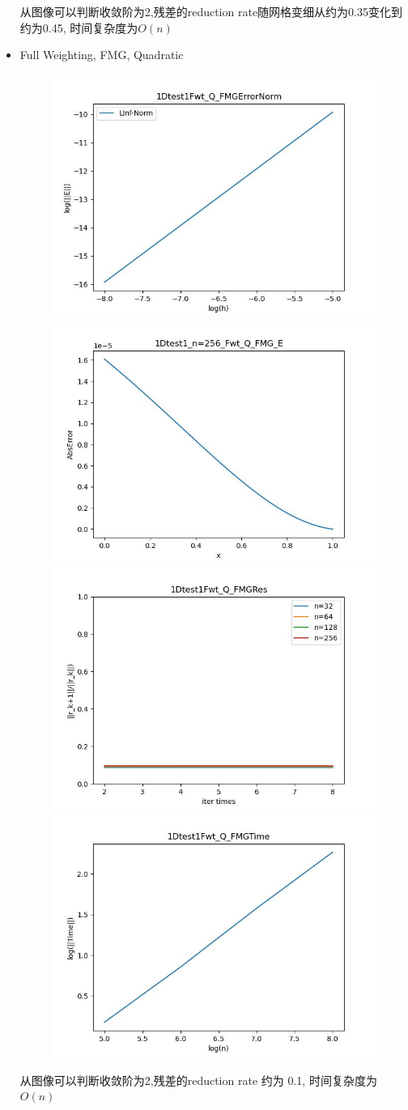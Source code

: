 \documentclass{article}
\begin{document}
\begin{itemize}
    从图像可以判断收敛阶为2,残差的reduction rate随网格变细从约为0.35变化到约为0.45, 时间复杂度为$O(n)$
    \newpage
    \item Full Weighting, FMG, Quadratic
    \begin{figure}[h]
        \centering
        \includegraphics[width=0.35\linewidth]{1Dtest1Fwt_Q_FMGErrorNorm.jpg}
        \includegraphics[width=0.35\linewidth]{1Dtest1_n=256_Fwt_Q_FMG_E.jpg}
        \includegraphics[width=0.35\linewidth]{1Dtest1Fwt_Q_FMGRes.jpg}
        \includegraphics[width=0.35\linewidth]{1Dtest1Fwt_Q_FMGTime.jpg}
    \end{figure}
    
    从图像可以判断收敛阶为2,残差的reduction rate 约为 0.1, 时间复杂度为$O(n)$


\end{itemize}
\end{document}
